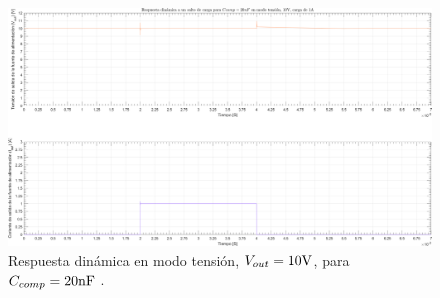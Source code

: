 \clearpage

\begin{figure}[H] %
\begin{center}
\includegraphics[width=1.1 \textwidth, angle=90]{./img/plots/dynamic/power_supply_CCOMP_20n_STEP_Modo1.png}
\caption{\label{fig:fig_power_supply_CCOMP_STEP_20n_Modo1}\footnotesize{Respuesta dinámica en modo tensión, $V_{out} = 10 \si[per-mode=symbol]{\volt}$, para $C_{comp} = 20 \si[per-mode=symbol]{\nano\farad} $ .}}
\end{center}
\end{figure}

\clearpage














%
%
%
%
%
%
%
%


